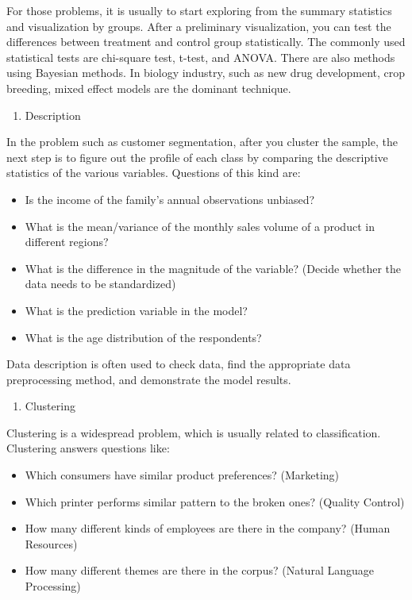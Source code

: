 \documentclass[12pt,]{krantz}
\providecommand{\tightlist}{%
  \setlength{\itemsep}{0pt}\setlength{\parskip}{0pt}}
\theoremstyle{definition}
\theoremstyle{definition}
\theoremstyle{remark}
\begin{document}
For those problems, it is usually to start exploring from the summary
statistics and visualization by groups. After a preliminary
visualization, you can test the differences between treatment and
control group statistically. The commonly used statistical tests are
chi-square test, t-test, and ANOVA. There are also methods using
Bayesian methods. In biology industry, such as new drug development,
crop breeding, mixed effect models are the dominant technique.

\begin{enumerate}
\def\labelenumi{\arabic{enumi}.}
\setcounter{enumi}{1}
\tightlist
\item
  Description
\end{enumerate}

In the problem such as customer segmentation, after you cluster the
sample, the next step is to figure out the profile of each class by
comparing the descriptive statistics of the various variables. Questions
of this kind are:

\begin{itemize}
\tightlist
\item
  Is the income of the family's annual observations unbiased?
\item
  What is the mean/variance of the monthly sales volume of a product in
  different regions?
\item
  What is the difference in the magnitude of the variable? (Decide
  whether the data needs to be standardized)
\item
  What is the prediction variable in the model?
\item
  What is the age distribution of the respondents?
\end{itemize}

Data description is often used to check data, find the appropriate data
preprocessing method, and demonstrate the model results.

\begin{enumerate}
\def\labelenumi{\arabic{enumi}.}
\setcounter{enumi}{2}
\tightlist
\item
  Clustering
\end{enumerate}

Clustering is a widespread problem, which is usually related to
classification. Clustering answers questions like:

\begin{itemize}
\tightlist
\item
  Which consumers have similar product preferences? (Marketing)
\item
  Which printer performs similar pattern to the broken ones? (Quality
  Control)
\item
  How many different kinds of employees are there in the company? (Human
  Resources)
\item
  How many different themes are there in the corpus? (Natural Language
  Processing)
\end{itemize}
\end{document}
